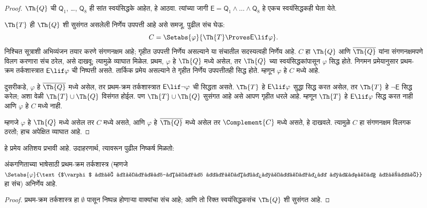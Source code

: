 \begin{proof}
$\Th{Q}$ ची $\mathsf{Q}_1$, \dots, $\mathsf{Q}_8$ ही सांत स्वयंसिद्धके आहेत,
हे आठवा. त्यांच्या जागी $\mathsf{E} = \mathsf{Q}_1 \land
\dots \land \mathsf{Q}_8$ हे एकच स्वयंसिद्धकही घेता येते.

$\Th{T}$ ही $\Th{Q}$ शी सुसंगत असलेली निर्णेय उपपत्ती आहे
असे समजू. पुढील संच घेऊ:
\[C = \Setabs{\varphi}{\Th{T} \Proves \mathsf{E} \lif \varphi}.
\]
निश्चित सूत्राशी अभिव्यंजन तयार करणे संगणनक्षम आहे;
गृहीत उपपत्ती निर्णेय असल्याने या संचातील सदस्यत्वही निर्णेय आहे.
$C$ हा $\Th{Q}$ आणि $\overline{\Th{Q}}$ यांना संगणनक्षमपणे
विलग करणारा संच ठरेल, असे दाखवू; त्यामुळे व्याघात मिळेल.
प्रथम, $\varphi$ हे $\Th{Q}$ मध्ये असेल, तर $\Th{Q}$ च्या
स्वयंसिद्धकांपासून $\varphi$ सिद्ध होते. निगमन प्रमेयानुसार
प्रथम-क्रम तर्कशास्त्रात $\mathsf{E} \lif \varphi$ ची निष्पत्ती
असते. तार्किक प्रमेय असल्याने ते गृहीत निर्णेय उपपत्तीतही सिद्ध होते.
म्हणून $\varphi$ हे $C$ मध्ये आहे.

दुसरीकडे, $\varphi$ हे $\overline{\Th{Q}}$ मध्ये असेल, तर प्रथम-क्रम
तर्कशास्त्रात $\mathsf{E} \lif \lnot \varphi$ ची सिद्धता असते.
$\Th{T}$ हे $\mathsf{E} \lif \varphi$ सुद्धा सिद्ध करत असेल, तर
$\Th{T}$ हे $\lnot \mathsf{E}$ सिद्ध करेल; अशा वेळी
$\Th{T} \cup \Th{Q}$ विसंगत होईल. पण
$\Th{T} \cup \Th{Q}$ सुसंगत आहे असे आपण गृहीत धरले आहे.
म्हणून $\Th{T}$ हे $\mathsf{E} \lif \varphi$ सिद्ध करत नाही आणि $\varphi$
हे $C$ मध्ये नाही.

म्हणजे $\varphi$ हे $\Th{Q}$ मध्ये असेल तर $C$ मध्ये असते,
आणि $\varphi$ हे $\overline{\Th{Q}}$ मध्ये असेल तर $\Complement{C}$
मध्ये असते, हे दाखवले. त्यामुळे $C$ हा संगणनक्षम विलगक
ठरतो; हाच अपेक्षित व्याघात आहे.
\end{proof}

हे प्रमेय अतिशय प्रभावी आहे. उदाहरणार्थ, त्यावरून पुढील निष्कर्ष मिळतो:

\begin{cor}
  अंकगणिताच्या भाषेसाठी प्रथम-क्रम तर्कशास्त्र (म्हणजे
  $\Setabs{\varphi}{\text{$\varphi$ हे प्रथम-क्रम तर्कशास्त्रात सिद्ध होते}}$
  हा संच) अनिर्णेय आहे.
\end{cor}

\begin{proof}
प्रथम-क्रम तर्कशास्त्र हा $\emptyset$ पासून निष्पन्न होणाऱ्या
वाक्यांचा संच आहे; आणि तो रिक्त स्वयंसिद्धकसंच $\Th{Q}$ शी सुसंगत आहे.
\end{proof}












